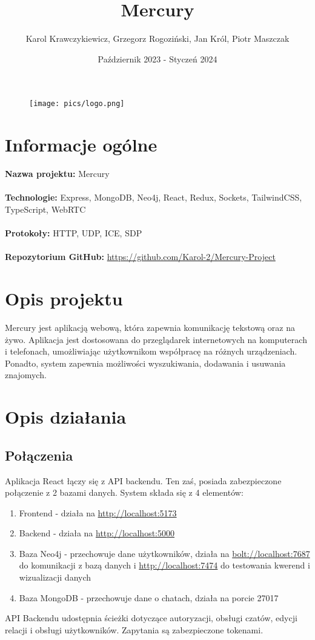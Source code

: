 \documentclass{article}
\title{Mercury}
\author{Karol Krawczykiewicz, Grzegorz Rogoziński, Jan Król, Piotr Maszczak}
\date{Październik 2023 - Styczeń 2024}
\begin{document}
\begin{figure}
    \centering
    \texttt{[image: pics/logo.png]}
\end{figure}

\maketitle
\section{Informacje ogólne}
\textbf{Nazwa projektu:} Mercury
\\
\\
\textbf{Technologie:} Express, MongoDB, Neo4j, React, Redux, Sockets, TailwindCSS, TypeScript, WebRTC
\\
\\
\textbf{Protokoły:} HTTP, UDP, ICE, SDP
\\
\\
\textbf{Repozytorium GitHub:}
\url{https://github.com/Karol-2/Mercury-Project}

\section{Opis projektu}
Mercury jest aplikacją webową, która zapewnia komunikację tekstową oraz na żywo. Aplikacja jest dostosowana do przeglądarek internetowych na komputerach i telefonach, umożliwiając użytkownikom współpracę na różnych urządzeniach. Ponadto, system zapewnia możliwości wyszukiwania, dodawania i usuwania znajomych.


\newpage
\section{Opis działania}
\subsection{Połączenia}

Aplikacja React łączy się z API backendu. Ten zaś, posiada zabezpieczone połączenie z 2 bazami danych. System składa się z 4 elementów:
\begin{enumerate}
  \item Frontend - działa na \url{http://localhost:5173}
  \item Backend - działa na \url{http://localhost:5000}
  \item Baza Neo4j - przechowuje dane użytkowników,
  działa na \url{bolt://localhost:7687} do komunikacji z bazą danych
  i \url{http://localhost:7474} do testowania kwerend i wizualizacji danych
  \item Baza MongoDB - przechowuje dane o chatach,  działa na porcie 27017
\end{enumerate}
API Backendu udostępnia ścieżki dotyczące autoryzacji, obsługi czatów, edycji relacji i obsługi użytkowników. Zapytania są zabezpieczone tokenami.
\end{document}
